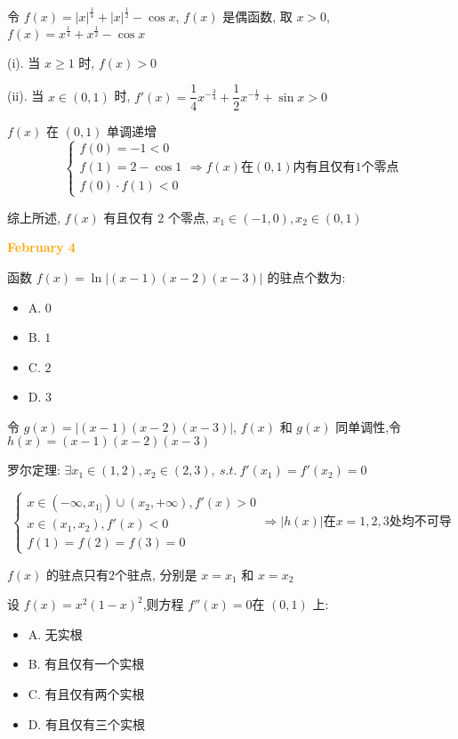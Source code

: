 \begin{solution}

	令 $f(x) = |x|^{\frac{1}{4}}+|x|^{\frac{1}{2}}-\cos x$, $f(x)$ 是偶函数, 取 $x > 0$, $f(x) = x^{\frac{1}{4}}+x^{\frac{1}{2}}-\cos x$

	(i). 当 $x \geq 1$ 时, $f(x) > 0$

	(ii). 当 $x\in (0,1)$ 时, $f'(x) = \dfrac{1}{4}x^{-\frac{3}{4}}+\dfrac{1}{2}x^{-\frac{1}{2}}+\sin x > 0$
	
	$f(x)$ 在 $(0,1)$ 单调递增
	$$\begin{cases}f(0) = -1<0\\f(1)=2-\cos 1\\ f(0)\cdot f(1)<0 \end{cases}\Rightarrow f(x)\text{在}(0,1) \text{内有且仅有} 1 \text{个零点}$$

	综上所述, $f(x)$ 有且仅有 $2$ 个零点, $x_{1}\in(-1,0),x_{2}\in(0,1)$
\end{solution}

\textcolor{orange}{\textbf{February 4}}

\begin{example}[][Exam: 28.1.7]
	函数 $f(x)=\ln|(x-1)(x-2)(x-3)|$ 的驻点个数为:
\begin{itemize}
	\item A. $0$
	\item B. $1$
	\item C. $2$
	\item D. $3$
\end{itemize}
\end{example}

\begin{solution}

	令 $g(x) =|(x-1)(x-2)(x-3)|$, $f(x)$ 和 $g(x)$ 同单调性,令 $h(x) = (x-1)(x-2)(x-3)$

	罗尔定理: $\exists x_{1}\in(1,2), x_{2}\in (2,3),\ s.t.\ f'(x_{1}) =f'(x_{2}) =0$

	$$\begin{cases}
	x\in(-\infty,x_{1]})\cup (x_{2},+\infty), f'(x) > 0\\
	x\in(x_{1}, x_{2}), f'(x) < 0\\
	f(1) =f(2) =f(3) =0
	\end{cases}\Rightarrow |h(x)|\text{在} x=1,2,3\text{处均不可导}$$

	$f(x)$ 的驻点只有$2$个驻点, 分别是 $x=x_{1}$ 和 $x=x_{2}$ 
\end{solution}

\begin{example}[][Exam: 28.1.8]
	设 $f(x)=x^{2}(1-x)^{2}$,则方程 $f''(x)=0$在 $(0,1)$ 上:
\begin{itemize}
	\item A. 无实根
	\item B. 有且仅有一个实根
	\item C. 有且仅有两个实根
	\item D. 有且仅有三个实根
\end{itemize}
\end{example}

